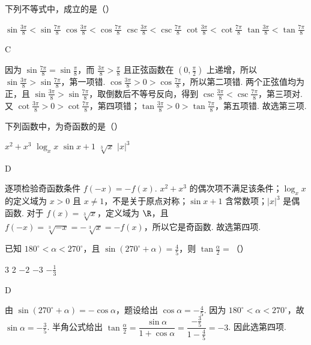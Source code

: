\documentclass[UTF8,a4paper,oneside,11pt]{ctexbook}
\begin{document}
\begin{problem}

下列不等式中，成立的是（\quad）

\choicesfive
    {\(\sin \frac{3\pi}{8} < \sin \frac{7\pi}{8}\)}
    {\(\cos \frac{3\pi}{8} < \cos \frac{7\pi}{8}\)}
    {\(\csc \frac{3\pi}{8} < \csc \frac{7\pi}{8}\)}
    {\(\cot \frac{3\pi}{8} < \cot \frac{7\pi}{8}\)}
    {\(\tan \frac{3\pi}{8} < \tan \frac{7\pi}{8}\)}
\begin{answer}
C
\end{answer}

\begin{solution}
因为 \(\sin\frac{7\pi}{8}=\sin\frac\pi8\)，而 \(\frac{3\pi}{8}>\frac\pi8\) 且正弦函数在 \(\left(0,\frac\pi2\right)\) 上递增，所以 \(\sin\frac{3\pi}{8}>\sin\frac{7\pi}{8}\)，第一项错.
\(\cos\frac{3\pi}{8}>0>\cos\frac{7\pi}{8}\)，所以第二项错. 两个正弦值均为正，且 \(\sin\frac{3\pi}{8}>\sin\frac{7\pi}{8}\)，取倒数后不等号反向，得到 \(\csc\frac{3\pi}{8}<\csc\frac{7\pi}{8}\)，第三项对.
又 \(\cot\frac{3\pi}{8}>0>\cot\frac{7\pi}{8}\)，第四项错；\(\tan\frac{3\pi}{8}>0>\tan\frac{7\pi}{8}\)，第五项错. 故选第三项.
\end{solution}
\end{problem}

\begin{problem}

下列函数中，为奇函数的是（\quad）

\choicesfive
    {\(x^{2} + x^{3}\)}
    {\(\log_{x}x\)}
    {\(\sin x + 1\)}
    {\(\sqrt[3]{x} \)}
    {\(|x|^{3} \)}
\begin{answer}
D
\end{answer}

\begin{solution}
逐项检验奇函数条件 \(f(-x)=-f(x)\). \(x^{2}+x^{3}\) 的偶次项不满足该条件；\(\log_xx\) 的定义域为 \(x>0\) 且 \(x\ne1\)，不是关于原点对称；\(\sin x+1\) 含常数项；\(|x|^{3}\) 是偶函数. 对于 \(f(x)=\sqrt[3]{x}\)，定义域为 \(\R\)，且 \(f(-x)=\sqrt[3]{-x}=-\sqrt[3]{x}=-f(x)\)，所以它是奇函数. 故选第四项.
\end{solution}
\end{problem}

\begin{problem}

已知 \(180^{\circ} < \alpha < 270^{\circ}\)，且 \(\sin (270^{\circ} + \alpha) = \frac{4}{5}\)，则 \(\tan \frac{\alpha}{2} =\)（\quad）

\choicesfive
    {3}
    {2}
    {\(-2\)}
    {\(-3\)}
    {\(-\frac{1}{3}\)}
\begin{answer}
D
\end{answer}

\begin{solution}
由 \(\sin(270^{\circ}+\alpha)=-\cos\alpha\)，题设给出 \(\cos\alpha=-\frac45\). 因为 \(180^{\circ}<\alpha<270^{\circ}\)，故 \(\sin\alpha=-\frac35\). 半角公式给出
\(\tan\frac\alpha2=\dfrac{\sin\alpha}{1+\cos\alpha}=\dfrac{-\frac{3}{5}}{1-\frac{4}{5}}=-3\). 因此选第四项.
\end{solution}
\end{problem}
\end{document}
